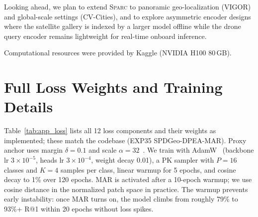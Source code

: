 \documentclass[sigconf, anonymous, review]{acmart}
\newcommand{\ours}{\textsc{Sparc}}
\begin{document}
Looking ahead, we plan to extend \ours{} to panoramic geo-localization (VIGOR) and global-scale settings (CV-Cities), and to explore asymmetric encoder designs where the satellite gallery is indexed by a larger model offline while the drone query encoder remains lightweight for real-time onboard inference.

\begin{acks}
Computational resources were provided by Kaggle (NVIDIA H100 80\,GB).
\end{acks}




\appendix

\section{Full Loss Weights and Training Details}
\label{sec:appendix_loss}

Table~\ref{tab:app_loss} lists all 12 loss components and their weights as implemented; these match the codebase (EXP35 SPDGeo-DPEA-MAR).
Proxy anchor uses margin $\delta{=}0.1$ and scale $\alpha{=}32$~\cite{kim2020proxy}.
We train with AdamW~\cite{loshchilov2019adamw} (backbone lr $3{\times}10^{-5}$, heads lr $3{\times}10^{-4}$, weight decay 0.01), a PK sampler with $P{=}16$ classes and $K{=}4$ samples per class, linear warmup for 5 epochs, and cosine decay to 1\% over 120 epochs.
MAR is activated after a 10-epoch warmup; we use cosine distance in the normalized patch space in practice.
The warmup prevents early instability: once MAR turns on, the model climbs from roughly 79\% to 93\%+ R@1 within 20 epochs without loss spikes.
\end{document}
